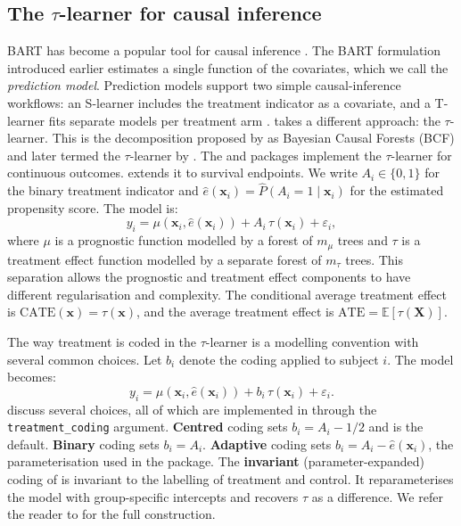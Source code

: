 \FloatBarrier

\subsection{\texorpdfstring{The \(\tau\)-learner for causal inference}{The \textbackslash tau-learner for causal inference}}\label{the-tau-learner-for-causal-inference}

BART has become a popular tool for causal inference \citep{hill2011bayesian, dorie2019automated}. The BART formulation introduced earlier estimates a single function of the covariates, which we call the \emph{prediction model}. Prediction models support two simple causal-inference workflows: an S-learner includes the treatment indicator as a covariate, and a T-learner fits separate models per treatment arm \citep{caron2022estimating}.  takes a different approach: the \(\tau\)-learner. This is the decomposition proposed by \citet{hahn2020bayesian} as Bayesian Causal Forests (BCF) and later termed the \(\tau\)-learner by \citet{caron2022estimating}. The  and  packages implement the \(\tau\)-learner for continuous outcomes.  extends it to survival endpoints. We write \(A_i \in \{0, 1\}\) for the binary treatment indicator and \(\hat{e}(\mathbf{x}_i) = \hat{P}(A_i = 1 \mid \mathbf{x}_i)\) for the estimated propensity score. The model is:
\[
y_i = \mu(\mathbf{x}_i, \hat{e}(\mathbf{x}_i)) + A_i\, \tau(\mathbf{x}_i) + \varepsilon_i,
\]
where \(\mu\) is a prognostic function modelled by a forest of \(m_\mu\) trees and \(\tau\) is a treatment effect function modelled by a separate forest of \(m_\tau\) trees. This separation allows the prognostic and treatment effect components to have different regularisation and complexity. The conditional average treatment effect is \(\text{CATE}(\mathbf{x}) = \tau(\mathbf{x})\), and the average treatment effect is \(\text{ATE} = \mathbb{E}[\tau(\mathbf{X})]\).

The way treatment is coded in the \(\tau\)-learner is a modelling convention with several common choices. Let \(b_i\) denote the coding applied to subject \(i\). The model becomes:
\[
y_i = \mu(\mathbf{x}_i, \hat{e}(\mathbf{x}_i)) + b_i\, \tau(\mathbf{x}_i) + \varepsilon_i.
\]
\citet{hahn2020bayesian} discuss several choices, all of which are implemented in  through the \texttt{treatment\_coding} argument. \textbf{Centred} coding sets \(b_i = A_i - 1/2\) and is the default. \textbf{Binary} coding sets \(b_i = A_i\). \textbf{Adaptive} coding sets \(b_i = A_i - \hat{e}(\mathbf{x}_i)\), the parameterisation used in the  package. The \textbf{invariant} (parameter-expanded) coding of \citet[Section 5.2]{hahn2020bayesian} is invariant to the labelling of treatment and control. It reparameterises the model with group-specific intercepts and recovers \(\tau\) as a difference. We refer the reader to \citet{hahn2020bayesian} for the full construction.

